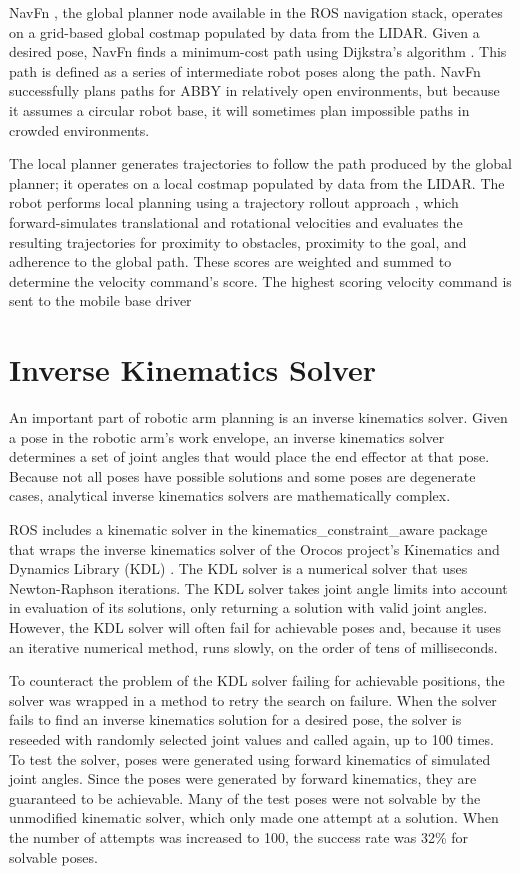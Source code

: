 \documentclass[]{cwru} %
\begin{document}
NavFn \cite{navfn}, the global planner node available in the ROS navigation
stack, operates on a grid-based global costmap populated by data from
the LIDAR. Given a desired pose, NavFn finds a minimum-cost path using
Dijkstra's algorithm \cite{dijkstra}. This path is defined as a series of
intermediate robot poses along the path. NavFn successfully plans paths
for ABBY in relatively open environments, but because it assumes a
circular robot base, it will sometimes plan impossible paths in crowded
environments.

The local planner generates trajectories to follow the path produced by
the global planner; it operates on a local costmap populated by data
from the LIDAR. The robot performs local planning using a trajectory
rollout approach \cite{thrun}, which forward-simulates translational and
rotational velocities and evaluates the resulting trajectories for
proximity to obstacles, proximity to the goal, and adherence to the
global path. These scores are weighted and summed to determine the
velocity command's score. The highest scoring velocity command is sent
to the mobile base driver

\section{Inverse Kinematics Solver}

An important part of robotic arm planning is an inverse kinematics
solver. Given a pose in the robotic arm's work envelope, an inverse
kinematics solver determines a set of joint angles that would place the
end effector at that pose. Because not all poses have possible solutions
and some poses are degenerate cases, analytical inverse kinematics
solvers are mathematically complex.

ROS includes a kinematic solver in the kinematics\_constraint\_aware
package that wraps the inverse kinematics solver of the Orocos project's
Kinematics and Dynamics Library (KDL) \cite{orocos} \cite{openrave}. The KDL solver is
a numerical solver that uses Newton-Raphson iterations. The KDL solver
takes joint angle limits into account in evaluation of its solutions,
only returning a solution with valid joint angles. However, the KDL
solver will often fail for achievable poses and, because it uses an
iterative numerical method, runs slowly, on the order of tens of
milliseconds.

To counteract the problem of the KDL solver failing for achievable
positions, the solver was wrapped in a method to retry the search on
failure. When the solver fails to find an inverse kinematics solution
for a desired pose, the solver is reseeded with randomly selected joint
values and called again, up to 100 times. To test the solver, poses were
generated using forward kinematics of simulated joint angles. Since the
poses were generated by forward kinematics, they are guaranteed to be
achievable. Many of the test poses were not solvable by the unmodified
kinematic solver, which only made one attempt at a solution. When the
number of attempts was increased to 100, the success rate was 32\% for
solvable poses.
\end{document}
